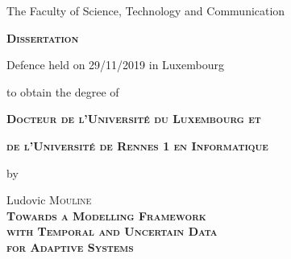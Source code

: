 \documentclass[12pt, twoside]{book}
\begin{document}
\begin{center}         
         \vspace{0.6cm}\noindent
         
         The Faculty of Science, Technology and Communication
         
         \vspace{1cm}\noindent
         {\LARGE \textbf{\textsc{Dissertation}}}
         
         \vspace{0.8cm}
         \noindent
         Defence held on 29/11/2019 in Luxembourg
         
         \vspace{0.5cm}\noindent
         to obtain the degree of
         
         \vspace{1.2cm}\noindent
         {\Large \textbf{\textsc{Docteur de l'Université du Luxembourg et}}}

         \vspace{0.2cm}\noindent
         {\Large \textbf{\textsc{de l'Université de Rennes 1 en Informatique}}}

         \vspace{0.5cm}\noindent
         {\Large by}

         \vspace{0.5cm}\noindent
         {\Large Ludovic \textsc{Mouline}}\\

         \vspace{1cm}\noindent
         {\LARGE \textbf{\textsc{Towards a Modelling Framework}}}\\[0.4cm] 
         {\LARGE \textbf{\textsc{ with Temporal and Uncertain Data}}}\\[0.4cm]
                  {\LARGE \textbf{\textsc{for Adaptive Systems}}}\\[0.4cm]
\end{center}

\vspace{0.4cm}
\end{document}

